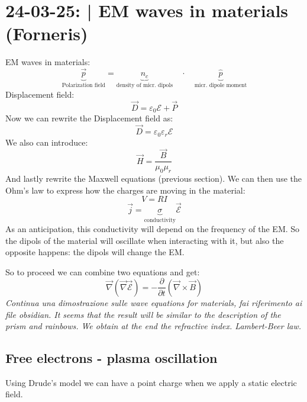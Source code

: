 \section{24-03-25: | EM waves in materials (Forneris)}

EM waves in materials:
\begin{equation}
    \underbrace{\vec{p}}_{\text{Polarization field}} = \underbrace{n_c}_{\text{density of micr. dipols}} \quad\cdot\quad \underbrace{\hat{p}}_{\text{micr. dipole moment}}
\end{equation}
Displacement field:
\begin{equation}
    \vec{D} = \varepsilon_0 \mathcal{E} + \vec{P}
\end{equation}
Now we can rewrite the Displacement field as:
\begin{equation}
    \vec{D} = \varepsilon_0 \varepsilon_r \mathcal{E}
\end{equation}
We also can introduce:
\begin{equation}
    \vec{H} = \frac{\vec{B}}{\mu_0\mu_r}
\end{equation}
And lastly rewrite the Maxwell equations (previous section).
We can then use the Ohm's law to express how the charges are moving in the material:
\begin{equation}
    V = RI
\end{equation}
\begin{equation}
    \vec{j} = \underbrace{\sigma}_{\text{conductivity}} \vec{\mathcal{E}}
\end{equation}
As an anticipation, this conductivity will depend on the frequency of the EM. So the dipols of the material will oscillate when interacting with it, but also the opposite happens: the dipols will change the EM.

So to proceed we can combine two equations and get:
\begin{equation}
    \vec{\nabla} \left( \vec{\nabla} \vec{\mathcal{E}}\right) = - \frac{\partial}{\partial t} \left(\vec{\nabla} \times \vec{B}\right)
\end{equation}
\textit{Continua una dimostrazione sulle wave equations for materials, fai riferimento ai file obsidian. It seems that the result will be similar to the description of the prism and rainbows. We obtain at the end the refractive index. Lambert-Beer law.}

\subsection{Free electrons - plasma oscillation}
Using Drude's model we can have a point charge when we apply a static electric field.   
